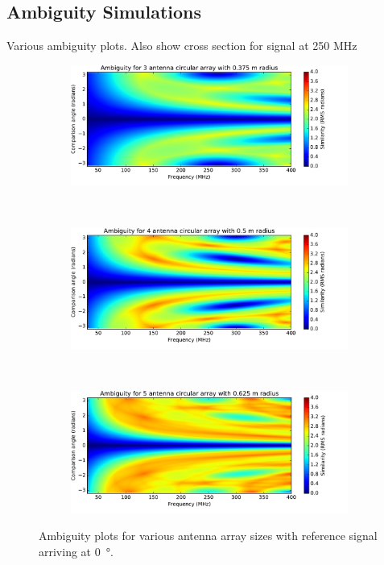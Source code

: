 \subsection{Ambiguity Simulations}
Various ambiguity plots. 
Also show cross section for signal at 250 MHz
\begin{figure}
  \centering
  \begin{subfigure}{\textwidth}
    \centering
    \includegraphics[width=\textwidth, clip=true, trim = 0 15 53 0]{ambiguity03}
  \end{subfigure}\\[1em]
  \begin{subfigure}{\textwidth}
    \centering
    \includegraphics[width=\textwidth, clip=true, trim = 0 15 53 0]{ambiguity04}
  \end{subfigure}\\[1em]
  \begin{subfigure}{\textwidth}
    \centering
    \includegraphics[width=\textwidth, clip=true, trim = 0 15 53 0]{ambiguity05}
  \end{subfigure}
  \caption{Ambiguity plots for various antenna array sizes with reference signal arriving at \SI{0}{\degree}.}
\end{figure}
